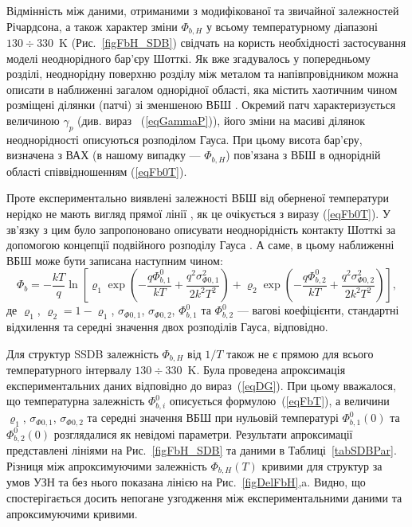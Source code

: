 Відмінність між даними, отриманими з модифікованої та звичайної залежностей Річардсона,
а також характер зміни $\Phi_{b,H}$ у всьому температурному діапазоні $130\div330$~K (Рис.~\ref{figFbH_SDB})
свідчать на користь необхідності застосування моделі неоднорідного бар'єру Шотткі.
Як вже згадувалось у попередньому розділі,
неоднорідну поверхню розділу між металом та напівпровідником можна описати в наближенні загалом однорідної області,
яка містить хаотичним чином розміщені ділянки (патчі) зі зменшеною ВБШ \cite{Tung:PhysRev,Tung:MSE}.
Окремий патч характеризується величиною $\gamma_p$ (див. вираз ~(\ref{eqGammaP})),
його зміни на масиві ділянок неоднорідності описуються розподілом Гауса.
При цьому висота бар'єру, визначена з ВАХ (в нашому випадку --- $\Phi_{b,H}$) пов'язана з ВБШ в однорідній області співвідношенням (\ref{eqFb0T}).

Проте експериментально виявлені залежності ВБШ від оберненої температури нерідко не мають вигляд прямої лінії \cite{KumarJAP2012,Tascioglu2010,Jiang:DG,Yildirima:DG,Jiang:DGJap},
як це очікується з виразу (\ref{eqFb0T}).
У зв'язку з цим було запропоновано описувати неоднорідність контакту Шотткі за допомогою концепції подвійного розподілу Гауса \cite{Jiang:DG,Yildirima:DG,Jiang:DGJap}.
А саме, в цьому наближенні ВБШ може бути записана наступним чином:
\begin{equation}
\label{eqDG}
  \Phi_b=-\frac{kT}{q}\ln\left[\varrho_1\exp\left(-\frac{q\Phi_{b,1}^0}{kT}+
  \frac{q^2\sigma^2_{\Phi0,1}}{2k^2T^2}\right)
   +
  \varrho_2\exp\left(-\frac{q\Phi_{b,2}^{0}}{kT}+
  \frac{q^2\sigma^2_{\Phi0,2}}{2k^2T^2}\right)\right],
\end{equation}
де
$\varrho_1$, $\varrho_2=1-\varrho_1$, $\sigma_{\Phi0,1}$, $\sigma_{\Phi0,2}$, $\Phi_{b,1}^0$ та $\Phi_{b,2}^0$ ---
вагові коефіцієнти, стандартні відхилення та середні значення двох розподілів Гауса, відповідно.

Для структур SSDB залежність $\Phi_{b,H}$ від $1/T$ також не є прямою для всього температурного інтервалу $130\div330$~K.
Була проведена апроксимація експериментальних даних відповідно до вираз~(\ref{eqDG}).
При цьому вважалося, що температурна залежність $\Phi_{b,i}^0$ описується формулою~(\ref{eqFbT}), а величини
$\varrho_1$, $\sigma_{\Phi0,1}$, $\sigma_{\Phi0,2}$ та середні значення ВБШ при нульовій температурі $\Phi_{b,1}^0(0)$ та $\Phi_{b,2}^0(0)$
розглядалися як невідомі параметри.
Результати апроксимації представлені лініями на Рис.~\ref{figFbH_SDB} та даними в Таблиці~\ref{tabSDBPar}.
Різниця між апроксимуючими залежність $\Phi_{b,H}(T)$ кривими для структур за умов УЗН та без нього
показана лінією на Рис.~\ref{figDelFbH},a.
Видно, що спостерігається досить непогане узгодження між експериментальними даними та апроксимуючими кривими.

